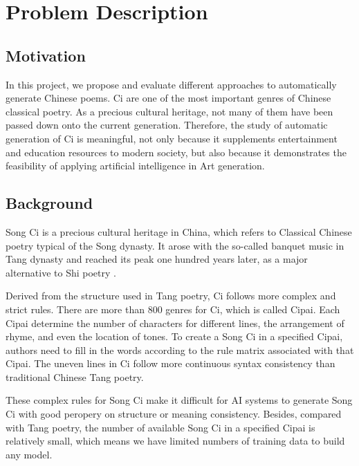 \section{Problem Description}
\subsection{Motivation}
%
In this project, we propose and evaluate different approaches to automatically generate Chinese poems.
%
Ci are one of the most important genres of Chinese classical poetry.
%
As a precious cultural heritage, not many of them have been passed down onto the current generation.
%
Therefore, the study of automatic generation of Ci is meaningful, not only because it supplements entertainment and education resources to modern society, but also because it demonstrates the feasibility of applying artificial intelligence in Art generation.
%

\subsection{Background}
Song Ci is a precious cultural heritage in China, which refers to Classical Chinese poetry typical of the Song dynasty.
%
It arose with the so-called banquet music in Tang dynasty and reached its peak one hundred years later, as a major alternative to Shi poetry\cite{cai2008chinesepoetry} .


Derived from the structure used in Tang poetry, Ci follows more complex and strict rules.
%
There are more than 800 genres for Ci, which is called Cipai\cite{wikici}.
%
Each Cipai determine the number of characters for different lines, the arrangement of rhyme, and even the location of tones.
%
To create a Song Ci in a specified Cipai, authors need to fill in the words according to the rule matrix associated with that Cipai.
 The uneven lines in Ci follow more continuous syntax consistency than traditional Chinese Tang poetry\cite{cai2008chinesepoetry}.

These complex rules for Song Ci make it difficult for AI systems to generate Song Ci with good peropery on structure or meaning consistency.
%
Besides, compared with Tang poetry, the number of available Song Ci in a specified Cipai is relatively small\cite{}, which means we have limited numbers of training data to build any model.


